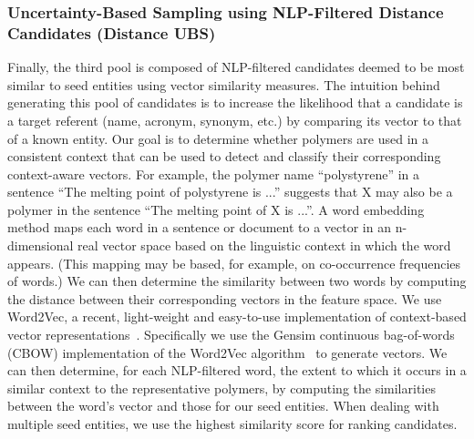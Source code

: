 \subsubsection{Uncertainty-Based Sampling using NLP-Filtered Distance Candidates (Distance UBS)}
Finally, the third pool is composed of NLP-filtered candidates deemed to be most similar to seed entities using vector similarity measures.
The intuition behind generating this pool of candidates is to increase the likelihood that a candidate is a target referent (name, acronym, synonym, etc.) by comparing its vector to that of a known entity.
Our goal is to determine whether polymers are used in a consistent context that can be used to detect and classify their corresponding context-aware vectors.
For example, the polymer name ``polystyrene'' in a sentence ``The
melting point of polystyrene is ...'' suggests that X may also be a polymer in the
sentence ``The melting point of X is ...''.
A word embedding method maps each word
in a sentence or document to a vector in an n-dimensional real vector space
based on the linguistic context in which the word appears. (This mapping may
be based, for example, on co-occurrence frequencies of words.) 
We can then
determine the similarity between two words by computing the distance between
their corresponding vectors in the feature space.
We use Word2Vec, a recent, light-weight and easy-to-use implementation of context-based vector representations~\cite{mikolov2013efficient,mikolov2013distributed}.
Specifically we use the Gensim continuous bag-of-words
(CBOW) implementation of the Word2Vec
algorithm~\cite{rehurek2010software} to generate vectors.
We can then determine, for each NLP-filtered word, the extent to which it occurs
in a similar context to the representative polymers, by computing the similarities
between the word's vector and those for our seed entities. 
When dealing with multiple seed entities, we use the highest similarity score for ranking candidates.

